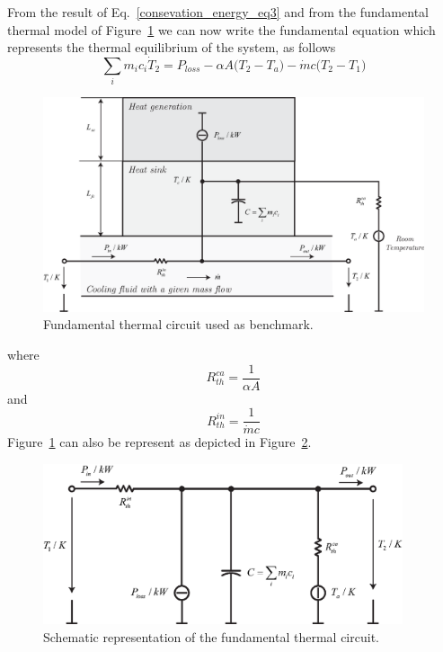 \documentclass[11pt,a4paper,oneside]{book}
\numberwithin{equation}{section}
\theoremstyle{it}
\theoremstyle{definition}
\begin{document}
From the result of Eq.~\eqref{consevation_energy_eq3} and from the fundamental thermal model of Figure~\ref{base_model_physical} we can now write the fundamental equation which represents the thermal equilibrium of the system, as follows
\begin{equation}
	\sum_{i}m_ic_i\dot{T}_2=P_{loss}-\alpha A\big(T_2-T_a\big)-\dot{m}c\big(T_2-T_1\big)
\end{equation}
\begin{figure}[H]
	\centering
	\includegraphics[width = 360pt, angle = 0, keepaspectratio]{figures/generic_thermal_model/generic_thermal_model_5.eps}
	\captionsetup{width=0.5\textwidth, font=small}	
	\caption{Fundamental thermal circuit used as benchmark.}
	\label{base_model_physical}
\end{figure}
where 
\begin{equation}
	R_{th}^{ca}=\frac{1}{\alpha A}
\end{equation}
and
\begin{equation}
	R_{th}^{in}=\frac{1}{\dot{m}c}
\end{equation}
Figure~\ref{base_model_physical} can also be represent as depicted in Figure~\ref{base_model_schematic}.
\begin{figure}[H]
	\centering
	\includegraphics[width = 300pt, angle = 0, keepaspectratio]{figures/generic_thermal_model/generic_thermal_model_base.eps}
	\captionsetup{width=0.5\textwidth, font=small}	
	\caption{Schematic representation of the fundamental thermal circuit.}
	\label{base_model_schematic}
\end{figure}
\end{document}
